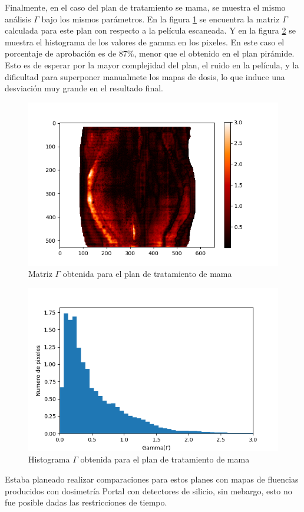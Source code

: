 Finalmente, en el caso del plan de tratamiento se mama, se muestra el mismo análisis $\Gamma$ bajo los mismos parámetros. En la figura \ref{fig:matrixGAmmaMAma} se encuentra la matriz $\Gamma$ calculada para este plan con respecto a la película escaneada. Y en la figura \ref{fig:histogramaGAmmaMama} se muestra el histograma de los valores de gamma en los pixeles. En este caso el porcentaje de aprobación es de 87\%, menor que el obtenido en el plan pirámide. Esto es de esperar por la mayor complejidad del plan, el ruido en la película, y la dificultad para superponer manualmete los mapas de dosis, lo que induce una desviación muy grande en el resultado final.\\

\begin{figure}[H]
	\centering
	\includegraphics[width=0.7\linewidth]{images/gammaMama.png}
	\caption{Matriz $\Gamma$ obtenida para el plan de tratamiento de mama }
	\label{fig:matrixGAmmaMAma}
\end{figure}
\begin{figure}[H]
	\centering
	\includegraphics[width=0.7\linewidth]{images/histogramaDosisMama.png}
	\caption{Histograma $\Gamma$ obtenida para el plan de tratamiento de mama  }
	\label{fig:histogramaGAmmaMama}
\end{figure}

Estaba planeado realizar comparaciones para estos planes con mapas de fluencias producidos con dosimetría Portal con detectores de silicio, sin mebargo, esto no fue posible dadas las restricciones de tiempo.





